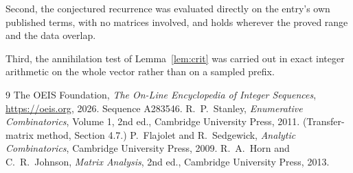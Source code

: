 \documentclass[11pt,a4paper]{article}
\theoremstyle{plain}
\theoremstyle{definition}
\begin{document}
Second, the conjectured recurrence was evaluated directly on the entry's own published terms,
with no matrices involved, and holds wherever the proved range and the data overlap.

Third, the annihilation test of Lemma~\ref{lem:crit} was carried out in exact integer
arithmetic on the whole vector rather than on a sampled prefix.

\begin{thebibliography}{9}
 The OEIS Foundation, \emph{The On-Line Encyclopedia of Integer
Sequences}, \url{https://oeis.org}, 2026. Sequence A283546.
 R.~P.~Stanley, \emph{Enumerative Combinatorics}, Volume 1, 2nd ed.,
Cambridge University Press, 2011. (Transfer-matrix method, Section 4.7.)
 P.~Flajolet and R.~Sedgewick, \emph{Analytic Combinatorics}, Cambridge
University Press, 2009.
 R.~A.~Horn and C.~R.~Johnson, \emph{Matrix Analysis}, 2nd ed., Cambridge
University Press, 2013.
\end{thebibliography}
\end{document}
